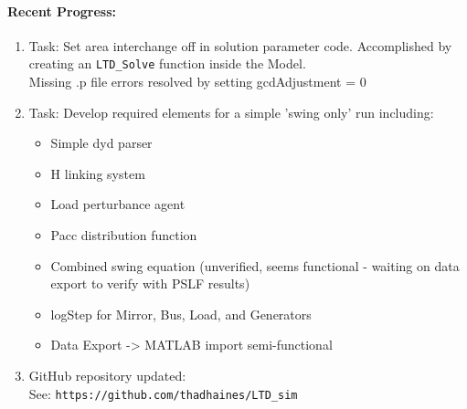 \documentclass[12pt]{article}
\begin{document}
	\paragraph{Recent Progress:}
	\begin{enumerate}
		\item Task: Set area interchange off in solution parameter code.
		\subitem Accomplished by creating an \verb|LTD_Solve| function inside the Model. \\
		Missing .p file errors resolved by setting gcdAdjustment = 0
		
		\item Task: Develop required elements for a simple 'swing only' run including:
		\begin{itemize}
			\item Simple dyd parser
			\item H linking system
			\item Load perturbance agent
			\item Pacc distribution function
			\item Combined swing equation (unverified, seems functional - waiting on data export to verify with PSLF results)
			\item logStep for Mirror, Bus, Load, and Generators
			\item Data Export -> MATLAB import semi-functional
		\end{itemize}
		
		\item GitHub repository updated:\\
		See: \verb|https://github.com/thadhaines/LTD_sim|
		
	\end{enumerate}
\end{document}
